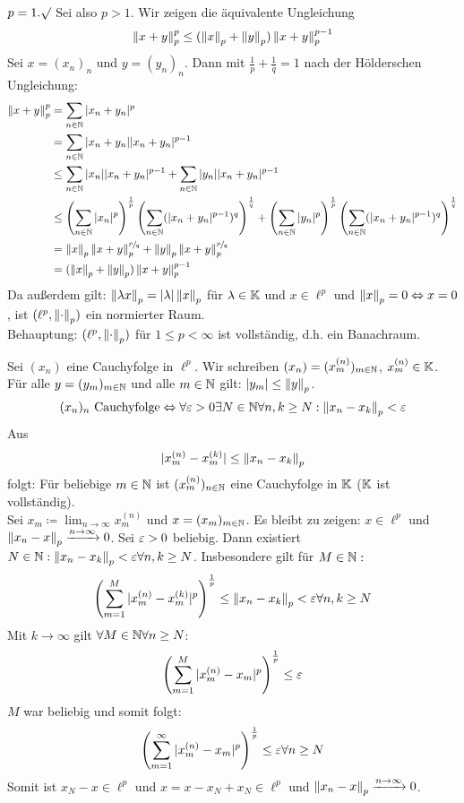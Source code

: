 \begin{beweis}
$ p=1.\surd $ Sei also $ p>1$. Wir zeigen die \"aquivalente Ungleichung
\[ \left\|x+y\right\|_p^p\leq(\left\|x\right\|_p+\left\|y\right\|_p)\left\|x+y\right\|^{p-1}_p \]
Sei $ x=(x_n)_n $ und $ y=(y_n)_n $. Dann mit $ \frac{1}{p}+\frac{1}{q}=1 $ nach der H\"olderschen Ungleichung:
\begin{align*} \left\|x+y\right\|_p^p&=\sum_{n\in\mathbb{N}}|x_n+y_n|^p\\&=\sum_{n\in\mathbb{N}}|x_n+y_n||x_n+y_n|^{p-1}\\&\leq\sum_{n\in\mathbb{N}}|x_n||x_n+y_n|^{p-1}+\sum_{n\in\mathbb{N}}|y_n||x_n+y_n|^{p-1}\\&\leq\left(\sum_{n\in\mathbb{N}}|x_n|^p\right)^\frac{1}{p}\left(\sum_{n\in\mathbb{N}}(|x_n+y_n|^{p-1})^q\right)^\frac{1}{q}+\left(\sum_{n\in\mathbb{N}}|y_n|^p\right)^\frac{1}{p}\left(\sum_{n\in\mathbb{N}}(|x_n+y_n|^{p-1})^q\right)^\frac{1}{q}\\&=\left\|x\right\|_p\left\|x+y\right\|_p^{\sfrac{p}{q}}+\left\|y\right\|_p\left\|x+y\right\|_p^{\sfrac{p}{q}}\\&=(\left\|x\right\|_p+\left\|y\right\|_p)\left\|x+y\right\|_p^{p-1} \end{align*}
Da au\ss erdem gilt: $ \left\|\lambda x\right\|_p=|\lambda|\left\|x\right\|_p $ f\"ur $ \lambda\in\mathbb{K} $ und $ x\in\ell^p $ und $ \left\|x\right\|_p=0\Leftrightarrow x=0 $, ist $ (\ell^p,\left\|\cdot\right\|_p) $ ein normierter Raum.\\
Behauptung: $ (\ell^p,\left\|\cdot\right\|_p) $ f\"ur $ 1\leq p<\infty $ ist vollst\"andig, d.h. ein Banachraum.
\begin{beweis}
Sei $ (x_n) $ eine Cauchyfolge in $ \ell^p $. Wir schreiben $ (x_n)=(x_m^{(n)})_{m\in\mathbb{N}} $, $ x_m^{(n)}\in\mathbb{K} $. F\"ur alle $ y=(y_m)_{m\in\mathbb{N}} $ und alle $ m\in\mathbb{N} $ gilt: $ |y_m|\leq\left\|y\right\|_p $.
\[ (x_n)_n\text{ Cauchyfolge}\Leftrightarrow\forall\varepsilon>0\exists N\in\mathbb{N}\forall n,k\geq N:\left\|x_n-x_k\right\|_p<\varepsilon \]
Aus
\[ |x_m^{(n)}-x_m^{(k)}|\leq\left\|x_n-x_k\right\|_p \]
folgt: F\"ur beliebige $ m\in\mathbb{N} $ ist $ (x_m^{(n)})_{n\in\mathbb{N}} $ eine Cauchyfolge in $ \mathbb{K} $ ($ \mathbb{K} $ ist vollst\"andig).\\
Sei $ x_m\coloneqq\lim_{n\to\infty}x_m^{(n)} $ und $ x=(x_m)_{m\in\mathbb{N}} $. Es bleibt zu zeigen: $ x\in\ell^p $ und $ \left\|x_n-x\right\|_p\xrightarrow{n\to\infty}0 $. Sei $ \varepsilon>0 $ beliebig. Dann existiert $ N\in\mathbb{N}:\left\|x_n-x_k\right\|_p<\varepsilon\forall n,k\geq N $. Insbesondere gilt f\"ur $ M\in\mathbb{N}: $
\[ \left(\sum_{m=1}^M|x_m^{(n)}-x_m^{(k)}|^p\right)^\frac{1}{p}\leq\left\|x_n-x_k\right\|_p<\varepsilon\forall n,k\geq N \]
Mit $ k\to\infty $ gilt $ \forall M\in\mathbb{N}\forall n\geq N $:
\[ \left(\sum_{m=1}^{M}|x_m^{(n)}-x_m|^p\right)^\frac{1}{p}\leq\varepsilon \]
$ M $ war beliebig und somit folgt:
\[ \left(\sum_{m=1}^{\infty}|x_m^{(n)}-x_m|^p\right)^\frac{1}{p}\leq\varepsilon\forall n\geq N \]
Somit ist $ x_N-x\in\ell^p $ und $ x=x-x_N+x_N\in\ell^p $ und $ \left\|x_n-x\right\|_p\xrightarrow{n\to\infty}0 $.
\end{beweis} 
\end{beweis}
